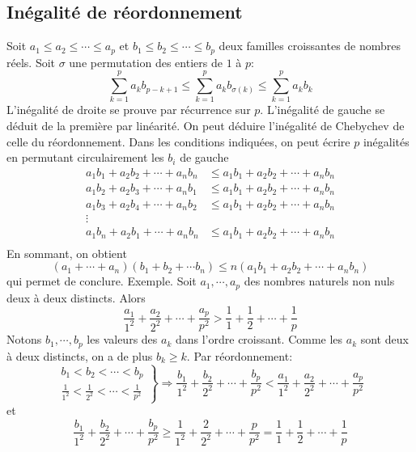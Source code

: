 \subsection{Inégalité de réordonnement}
Soit $a_1\leq a_2\leq \cdots \leq a_p$ et $b_1\leq b_2\leq \cdots \leq b_p$ deux familles croissantes de nombres réels. Soit $\sigma$ une permutation des entiers de $1$ à $p$:
\begin{displaymath}
\sum_{k=1}^p a_k b_{p-k+1} \leq \sum_{k=1}^p a_k b_{\sigma(k)} \leq \sum_{k=1}^p a_k b_k  
\end{displaymath}
L'inégalité de droite se prouve par récurrence sur $p$. L'inégalité de gauche se déduit de la première par linéarité.\newline
On peut déduire l'inégalité de Chebychev de celle du réordonnement.\newline
Dans les conditions indiquées, on peut écrire $p$ inégalités en permutant circulairement les $b_i$ de gauche
\begin{align*}
  a_1 b_1 + a_2b_2 + \cdots + a_nb_n &\leq a_1 b_1 + a_2b_2 + \cdots + a_nb_n \\
  a_1 b_2 + a_2b_3 + \cdots + a_nb_1 &\leq a_1 b_1 + a_2b_2 + \cdots + a_nb_n \\
  a_1 b_3 + a_2b_4 + \cdots + a_nb_2 &\leq a_1 b_1 + a_2b_2 + \cdots + a_nb_n \\
  \vdots & \\
  a_1 b_n + a_2b_1 + \cdots + a_nb_n &\leq a_1 b_1 + a_2b_2 + \cdots + a_nb_n \\
\end{align*}
En sommant, on obtient
\begin{displaymath}
  (a_1+\cdots + a_n)(b_1+b_2+\cdots b_n) \leq n(a_1 b_1 + a_2b_2 + \cdots + a_nb_n) 
\end{displaymath}
qui permet de conclure.\newline
Exemple. Soit $a_1, \cdots, a_p$ des nombres naturels non nuls deux à deux distincts. Alors
\begin{displaymath}
  \frac{a_1}{1^2} +  \frac{a_2}{2^2} + \cdots +  \frac{a_p}{p^2} > \frac{1}{1} + \frac{1}{2} + \cdots +\frac{1}{p}
\end{displaymath}
Notons $b_1, \cdots, b_p$ les valeurs des $a_k$ dans l'ordre croissant. Comme les $a_k$ sont deux à deux distincts, on a de plus $b_k\geq k$. Par réordonnement:
\begin{displaymath}
  \left. 
\begin{aligned}
b_1 < b_2 < \cdots <b_p \\ \frac{1}{1^2}< \frac{1}{2^2}< \cdots <\frac{1}{p^2}  
\end{aligned}
\right\rbrace \Rightarrow
\frac{b_1}{1^2}+ \frac{b_2}{2^2}+ \cdots +\frac{b_p}{p^2} < \frac{a_1}{1^2}+ \frac{a_2}{2^2}+ \cdots +\frac{a_p}{p^2}
\end{displaymath}
et
\begin{displaymath}
\frac{b_1}{1^2}+ \frac{b_2}{2^2}+ \cdots +\frac{b_p}{p^2} \geq  \frac{1}{1^2}+ \frac{2}{2^2}+ \cdots +\frac{p}{p^2}
=\frac{1}{1} + \frac{1}{2} + \cdots + \frac{1}{p} 
\end{displaymath}

